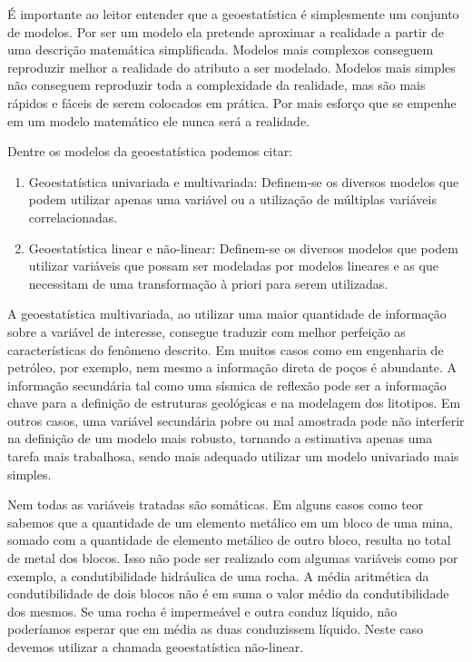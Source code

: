 É importante ao leitor entender que a geoestatística é simplesmente um conjunto de modelos. Por ser um modelo ela pretende aproximar a realidade a partir de uma descrição matemática simplificada. Modelos mais complexos conseguem reproduzir melhor a realidade do atributo a ser modelado. Modelos mais simples não conseguem reproduzir toda a complexidade da realidade, mas são mais rápidos e fáceis de serem colocados em prática. Por mais esforço que se empenhe em um modelo matemático ele nunca será a realidade.

Dentre os modelos da geoestatística podemos citar:

\begin{enumerate}
\item Geoestatística univariada e multivariada: Definem-se os diversos modelos que podem utilizar apenas uma variável ou a utilização de múltiplas variáveis correlacionadas.
\item Geoestatística linear e não-linear: Definem-se os diversos modelos que podem utilizar variáveis que possam ser modeladas por modelos lineares e as que necessitam de uma transformação à priori para serem utilizadas. 
\end{enumerate}

A geoestatística multivariada, ao utilizar uma maior quantidade de informação sobre a variável de interesse, consegue traduzir com melhor perfeição as características do fenômeno descrito. Em muitos casos como em engenharia de petróleo, por exemplo, nem mesmo a informação direta de poços é abundante. A informação secundária tal como uma sísmica de reflexão pode ser a informação chave para a definição de estruturas geológicas e na modelagem dos litotipos. Em outros casos, uma variável secundária pobre ou mal amostrada pode não interferir na definição de um modelo mais robusto, tornando a estimativa apenas uma tarefa mais trabalhosa, sendo mais adequado utilizar um modelo univariado mais simples. 

Nem todas as variáveis tratadas são somáticas. Em alguns casos como teor sabemos que a quantidade de um elemento metálico em um bloco de uma mina, somado com a quantidade de elemento metálico de outro bloco, resulta no total de metal dos blocos. Isso não pode ser realizado com algumas variáveis como por exemplo, a condutibilidade hidráulica de uma rocha. A média aritmética da condutibilidade de dois blocos não é em suma o valor médio da condutibilidade dos mesmos. Se uma rocha é impermeável e outra conduz líquido, não poderíamos esperar que em média as duas conduzissem líquido. Neste caso devemos utilizar a chamada geoestatística não-linear. 

